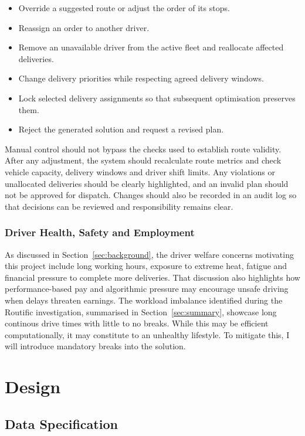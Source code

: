 \documentclass[11pt]{article}
\begin{document}
\begin{itemize}
    \item Override a suggested route or adjust the order of its stops.
    \item Reassign an order to another driver.
    \item Remove an unavailable driver from the active fleet and reallocate affected deliveries.
    \item Change delivery priorities while respecting agreed delivery windows.
    \item Lock selected delivery assignments so that subsequent optimisation preserves them.
    \item Reject the generated solution and request a revised plan.
\end{itemize}

Manual control should not bypass the checks used to establish route validity. After any adjustment, the system should recalculate route metrics and check vehicle capacity, delivery windows and driver shift limits. Any violations or unallocated deliveries should be clearly highlighted, and an invalid plan should not be approved for dispatch. Changes should also be recorded in an audit log so that decisions can be reviewed and responsibility remains clear.

\subsubsection{Driver Health, Safety and Employment}
As discussed in Section~\ref{sec:background}, the driver welfare concerns motivating this project include long working hours, exposure to extreme heat, fatigue and financial pressure to complete more deliveries. That discussion also highlights how performance-based pay and algorithmic pressure may encourage unsafe driving when delays threaten earnings. The workload imbalance identified during the Routific investigation, summarised in Section~\ref{sec:summary}, showcase long continous drive times with little to no breaks. While this may be efficient computationally, it may constitute to an unhealthy lifestyle. To mitigate this, I will introduce mandatory breaks into the solution.   

\newpage
\section{Design}

\subsection{Data Specification}
\end{document}

